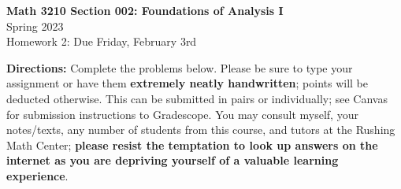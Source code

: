 \documentclass[10pt]{article}
\begin{document}
\begin{center}
\textbf{Math 3210 Section 002: Foundations of Analysis I}\\ 
Spring 2023\\
Homework 2: Due Friday, February 3rd 
\end{center}

\noindent\textbf{Directions:} Complete the problems below. Please be sure to type your assignment or have them \textbf{extremely neatly handwritten}; points will be deducted otherwise. This can be submitted in pairs or individually; see Canvas for submission instructions to Gradescope. You may consult myself, your notes/texts, any number of students from this course, and tutors at the Rushing Math Center; \textbf{please resist the temptation to look up answers on the internet as you are depriving yourself of a valuable learning experience}. 
\end{document}
